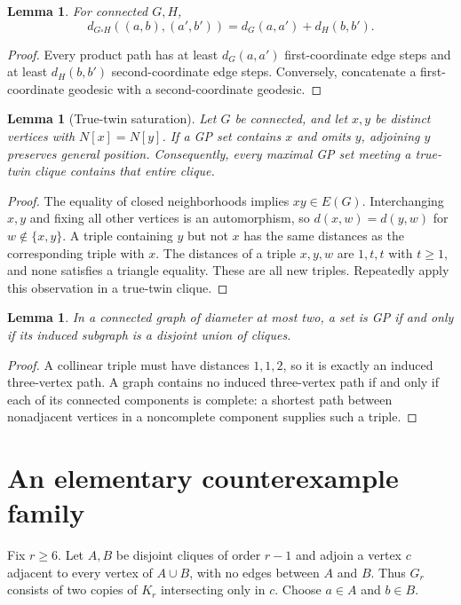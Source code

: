 \documentclass[11pt]{article}
\newtheorem{lemma}[theorem]{Lemma}
\theoremstyle{definition}
\theoremstyle{remark}
\begin{document}
\begin{lemma}\label{lem:distance}
For connected $G,H$,
\[
 d_{G\square H}((a,b),(a',b'))=d_G(a,a')+d_H(b,b').
\]
\end{lemma}
\begin{proof}
Every product path has at least $d_G(a,a')$ first-coordinate edge steps and
at least $d_H(b,b')$ second-coordinate edge steps. Conversely, concatenate
a first-coordinate geodesic with a second-coordinate geodesic.
\end{proof}

\begin{lemma}[True-twin saturation]\label{lem:twins}
Let $G$ be connected, and let $x,y$ be distinct vertices with $N[x]=N[y]$.
If a GP set contains $x$ and omits $y$, adjoining $y$ preserves general
position. Consequently, every maximal GP set meeting a true-twin clique
contains that entire clique.
\end{lemma}
\begin{proof}
The equality of closed neighborhoods implies $xy\in E(G)$. Interchanging
$x,y$ and fixing all other vertices is an automorphism, so
$d(x,w)=d(y,w)$ for $w\notin\{x,y\}$. A triple containing $y$ but not $x$
has the same distances as the corresponding triple with $x$. The distances
of a triple $x,y,w$ are $1,t,t$ with $t\geq1$, and none satisfies a triangle
equality. These are all new triples. Repeatedly apply this observation in
a true-twin clique.
\end{proof}

\begin{lemma}\label{lem:diameter-two}
In a connected graph of diameter at most two, a set is GP if and only if
its induced subgraph is a disjoint union of cliques.
\end{lemma}
\begin{proof}
A collinear triple must have distances $1,1,2$, so it is exactly an induced
three-vertex path. A graph contains no induced three-vertex path if and
only if each of its connected components is complete: a shortest path
between nonadjacent vertices in a noncomplete component supplies such a
triple.
\end{proof}

\section{An elementary counterexample family}\label{sec:construction}

Fix $r\geq6$. Let $A,B$ be disjoint cliques of order $r-1$ and adjoin a
vertex $c$ adjacent to every vertex of $A\cup B$, with no edges between
$A$ and $B$. Thus $G_r$ consists of two copies of $K_r$ intersecting only
in $c$. Choose $a\in A$ and $b\in B$.
\end{document}
